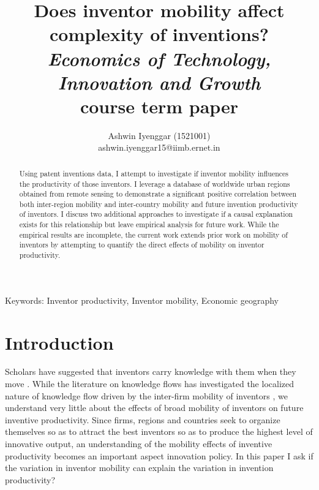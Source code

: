 \documentclass[12pt]{article}
\begin{document}
\title{\LARGE Does inventor mobility affect complexity of inventions?\\ \Large \textit{Economics of Technology, Innovation and Growth} \\course term paper}
\author{Ashwin Iyenggar  (1521001) \\ ashwin.iyenggar15@iimb.ernet.in} 
\large

\maketitle
\thispagestyle{empty}

\begin{abstract}
\large \noindent Using patent inventions data, I attempt to investigate if inventor mobility influences the productivity of those inventors. I leverage a database of worldwide urban regions  obtained from remote sensing to demonstrate a significant positive correlation between both inter-region mobility  and inter-country mobility and future invention productivity of inventors. I discuss two additional approaches to investigate if a causal explanation exists for this relationship but leave empirical analysis for future work. While the empirical results are incomplete, the current work extends prior work on mobility of inventors by attempting to quantify the direct effects of  mobility on inventor productivity.
\end{abstract}
{Keywords:} Inventor productivity, Inventor mobility, Economic geography
\onehalfspacing
\section{Introduction}
Scholars have suggested that inventors carry knowledge with them when they move \citep{Almeida1999}. While the literature on knowledge flows has investigated the localized nature of knowledge flow driven by the inter-firm mobility of inventors \citep{Jaffe1993, Almeida1999, Alcacer2006a}, we understand very little about the effects of broad mobility of inventors on future inventive productivity. Since firms, regions and countries seek to organize themselves so as to attract the best inventors so as to produce the highest level of innovative output, an understanding of the mobility effects of inventive productivity becomes an important aspect innovation policy. In this paper I ask if  the variation in inventor mobility can explain the variation in invention productivity?
\end{document}
